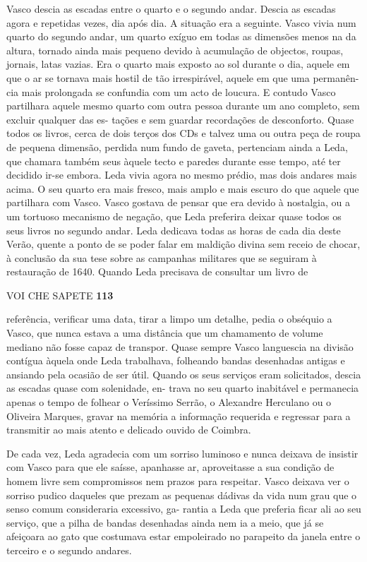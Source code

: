 Vasco descia as escadas entre o quarto e o segundo andar. Descia as
escadas agora e repetidas vezes, dia após dia. A situação era a
seguinte. Vasco vivia num quarto do segundo andar, um quarto exíguo em
todas as dimensões menos na da altura, tornado ainda mais pequeno devido
à acumulação de objectos, roupas, jornais, latas vazias. Era o quarto
mais exposto ao sol durante o dia, aquele em que o ar se tornava mais
hostil de tão irrespirável, aquele em que uma permanên- cia mais
prolongada se confundia com um acto de loucura. E contudo Vasco
partilhara aquele mesmo quarto com outra pessoa durante um ano completo,
sem excluir qualquer das es- tações e sem guardar recordações de
desconforto. Quase todos os livros, cerca de dois terços dos CDs e
talvez uma ou outra peça de roupa de pequena dimensão, perdida num fundo
de gaveta, pertenciam ainda a Leda, que chamara também seus àquele tecto
e paredes durante esse tempo, até ter decidido ir-se embora. Leda vivia
agora no mesmo prédio, mas dois andares mais acima. O seu quarto era
mais fresco, mais amplo e mais escuro do que aquele que partilhara com
Vasco. Vasco gostava de pensar que era devido à nostalgia, ou a um
tortuoso mecanismo de negação, que Leda preferira deixar quase todos os
seus livros no segundo andar. Leda dedicava todas as horas de cada dia
deste Verão, quente a ponto de se poder falar em maldição divina sem
receio de chocar, à conclusão da sua tese sobre as campanhas militares
que se seguiram à restauração de 1640. Quando Leda precisava de
consultar um livro de

VOI CHE SAPETE \textbf{113}

referência, verificar uma data, tirar a limpo um detalhe, pedia o
obséquio a Vasco, que nunca estava a uma distância que um chamamento de
volume mediano não fosse capaz de transpor. Quase sempre Vasco
languescia na divisão contígua àquela onde Leda trabalhava, folheando
bandas desenhadas antigas e ansiando pela ocasião de ser útil. Quando os
seus serviços eram solicitados, descia as escadas quase com solenidade,
en- trava no seu quarto inabitável e permanecia apenas o tempo de
folhear o Veríssimo Serrão, o Alexandre Herculano ou o Oliveira Marques,
gravar na memória a informação requerida e regressar para a transmitir
ao mais atento e delicado ouvido de Coimbra.

De cada vez, Leda agradecia com um sorriso luminoso e nunca deixava de
insistir com Vasco para que ele saísse, apanhasse ar, aproveitasse a sua
condição de homem livre sem compromissos nem prazos para respeitar.
Vasco deixava ver o sorriso pudico daqueles que prezam as pequenas
dádivas da vida num grau que o senso comum consideraria excessivo, ga-
rantia a Leda que preferia ficar ali ao seu serviço, que a pilha de
bandas desenhadas ainda nem ia a meio, que já se afeiçoara ao gato que
costumava estar empoleirado no parapeito da janela entre o terceiro e o
segundo andares.

